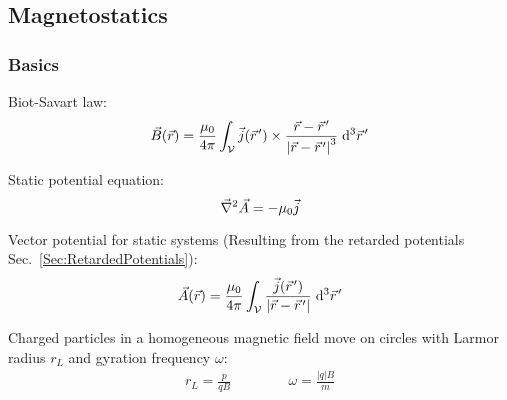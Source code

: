 	\subsection{Magnetostatics}
		\subsubsection{Basics}
			\noindent
			Biot-Savart law:
			\begin{equation}
				\vec{B}(\vec{r}) = \frac{\mu_0}{4\pi}\int_{\mathcal{V}} \vec{j}(\pvec{r}')\times\frac{\vec{r}-\pvec{r}'}{\left|\vec{r}-\pvec{r}'\right|^3}\;\diff^3\pvec{r}'
			\end{equation}

			\noindent
			Static potential equation:
			\begin{equation}
				\vec{\nabla}^2 \vec{A} = - \mu_0 \vec{j}
			\end{equation}

			\noindent
			Vector potential for static systems (Resulting from the retarded potentials Sec.~\ref{Sec:RetardedPotentials}):
			\begin{equation}
				\vec{A}(\vec{r}) = \frac{\mu_0}{4\pi} \int_{\mathcal{V}} \frac{\vec{j}(\pvec{r}')}{\left|\vec{r}-\pvec{r}'\right|} \;\diff^3\pvec{r}'
			\end{equation}

			\noindent
			Charged particles in a homogeneous magnetic field move on circles with Larmor radius $r_L$ and gyration frequency $\omega$:
			\begin{equation}
				\begin{aligned}
					r_L = \frac{p}{qB} &&\hspace{30pt} %
					\omega = \frac{|q| B}{m}
				\end{aligned}
			\end{equation}

